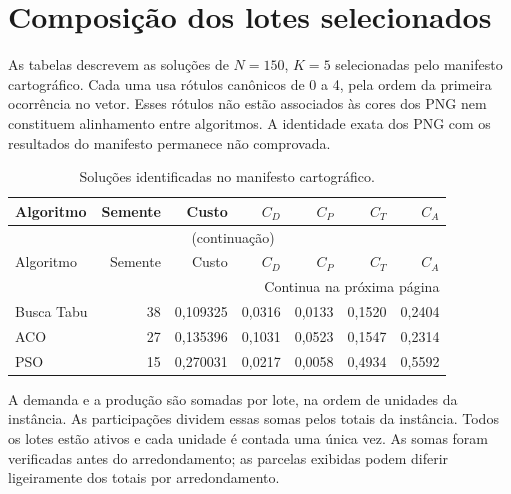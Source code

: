 \clearpage\section{Composição dos lotes selecionados}\label{ap:lotes}

As tabelas descrevem as soluções de $N=150$, $K=5$ selecionadas pelo manifesto cartográfico. Cada uma usa rótulos canônicos de 0 a 4, pela ordem da primeira ocorrência no vetor. Esses rótulos não estão associados às cores dos PNG nem constituem alinhamento entre algoritmos. A identidade exata dos PNG com os resultados do manifesto permanece não comprovada.

\begingroup\small
\setlength{\tabcolsep}{5pt}
\begin{longtable}{lrrrrrr}
\caption{Soluções identificadas no manifesto cartográfico.}\label{tab:selecionadas}\\
\toprule
Algoritmo & Semente & Custo & $C_D$ & $C_P$ & $C_T$ & $C_A$ \\
\midrule
\endfirsthead
\multicolumn{7}{c}{\tablename~\thetable{} (continuação)}\\
\toprule
Algoritmo & Semente & Custo & $C_D$ & $C_P$ & $C_T$ & $C_A$ \\
\midrule
\endhead
\midrule\multicolumn{7}{r}{Continua na próxima página}\\
\endfoot
\bottomrule
\endlastfoot
Busca Tabu & 38 & 0,109325 & 0,0316 & 0,0133 & 0,1520 & 0,2404 \\
ACO & 27 & 0,135396 & 0,1031 & 0,0523 & 0,1547 & 0,2314 \\
PSO & 15 & 0,270031 & 0,0217 & 0,0058 & 0,4934 & 0,5592 \\
\end{longtable}
\endgroup

A demanda e a produção são somadas por lote, na ordem de unidades da instância. As participações dividem essas somas pelos totais da instância. Todos os lotes estão ativos e cada unidade é contada uma única vez. As somas foram verificadas antes do arredondamento; as parcelas exibidas podem diferir ligeiramente dos totais por arredondamento.

